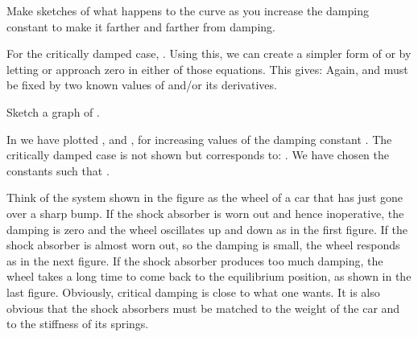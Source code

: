 {\tryit Make sketches of what happens to the curve as you increase the damping
constant to make it farther and farther from  damping.


For the critically damped case, .
Using this, we can create a simpler form of  or
 by letting \m{\omega} or  approach zero in either
%
of those equations.
%
%
This gives:
%
%
Again,  and  must be fixed by two known values of  and/or its
derivatives.

\tryit  Sketch a graph of .

In  we have plotted ,  and , for increasing
values of the damping constant \m{\lambda}.
The critically damped case is not shown but corresponds to:
.
We have chosen the constants such that .

Think of the system shown in the figure as the wheel of a car that
has just gone over a sharp bump.
If the shock absorber is worn out and hence inoperative, the damping is zero
and the wheel oscillates up and down as in the first figure.
If the shock absorber is almost worn out, so the damping is small, the wheel
responds as in the next figure.
If the shock absorber produces too much damping, the wheel takes a long time
to come back to the equilibrium position, as shown in the last figure.
Obviously, critical damping is close to what one wants.
It is also obvious that the shock absorbers must be matched to the weight of
the car and to the stiffness of its springs.
}%
%
%
